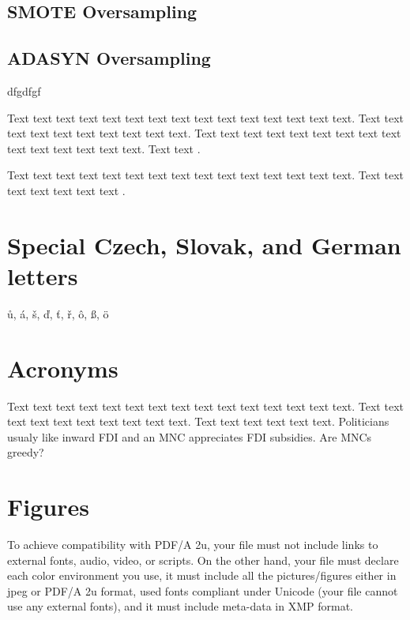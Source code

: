 \subsection{SMOTE Oversampling}
\subsection{ADASYN Oversampling}

dfgdfgf

\label{sec:citace}

Text text text text text text text text text text text text text text text. Text text text text text text text text text text. Text text text text text text text text text text text text text text text. Text text  \citet{Haufler2006}.

Text text text text text text text text text text text text text text text. Text text text text text text text \cite[see, ,][pg.~10]{Haaparanta1996}. 

\section{Special Czech, Slovak, and German letters}

\r{u}, \'{a}, \v{s}, \v{d}, \v{t}, \v{r}, \^{o}, \ss{}, \"{o}

\section{Acronyms}

Text text text text text text text text text text text text text text text. Text text text text text text text text text text. Text text text text text text. Politicians usualy like inward \ac{FDI} and an \ac{MNC} appreciates \ac{FDI} subsidies. Are \acp{MNC} greedy?

\section{Figures}

To achieve compatibility with PDF/A 2u, your file must not include links to external fonts, audio, video, or scripts. On the other hand, your file must declare each color environment you use, it must include all the pictures/figures either in jpeg or PDF/A 2u format, used fonts compliant under Unicode (your file cannot use any external fonts), and it must include meta-data in XMP format.


